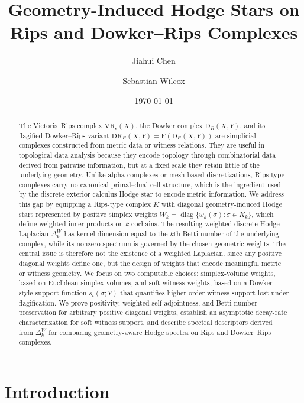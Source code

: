 \documentclass[11pt]{amsart}
\title[Geometry-Induced Hodge Stars on Rips-Type Complexes]
      {Geometry-Induced Hodge Stars on Rips and Dowker--Rips Complexes}
\author{Jiahui Chen}
\author{Sebastian Wilcox}
\date{\today}
\theoremstyle{plain}
\newcommand{\Dow}{\mathrm{D}}
\newcommand{\DR}{\mathrm{DR}}
\newcommand{\Flag}{\mathrm{F}}
\begin{document}
\begin{abstract}
    The Vietoris--Rips complex $\mathrm{VR}_\epsilon(X)$, the Dowker complex $\Dow_R(X,Y)$, and its flagified Dowker--Rips variant $\DR_R(X,Y)=\Flag(\Dow_R(X,Y))$ are simplicial complexes constructed from metric data or witness relations. They are useful in topological data analysis because they encode topology through combinatorial data derived from pairwise information, but at a fixed scale they retain little of the underlying geometry. Unlike alpha complexes or mesh-based discretizations, Rips-type complexes carry no canonical primal--dual cell structure, which is the ingredient used by the discrete exterior calculus Hodge star to encode metric information. We address this gap by equipping a Rips-type complex $K$ with diagonal geometry-induced Hodge stars represented by positive simplex weights $W_k=\operatorname{diag}\{w_k(\sigma):\sigma\in K_k\}$, which define weighted inner products on $k$-cochains. The resulting weighted discrete Hodge Laplacian $\Delta_k^W$ has kernel dimension equal to the $k$th Betti number of the underlying complex, while its nonzero spectrum is governed by the chosen geometric weights. The central issue is therefore not the existence of a weighted Laplacian, since any positive diagonal weights define one, but the design of weights that encode meaningful metric or witness geometry. We focus on two computable choices: simplex-volume weights, based on Euclidean simplex volumes, and soft witness weights, based on a Dowker-style support function $s_t(\sigma;Y)$ that quantifies higher-order witness support lost under flagification. We prove positivity, weighted self-adjointness, and Betti-number preservation for arbitrary positive diagonal weights, establish an asymptotic decay-rate characterization for soft witness support, and describe spectral descriptors derived from $\Delta_k^W$ for comparing geometry-aware Hodge spectra on Rips and Dowker--Rips complexes.
\end{abstract}

\maketitle

\section{Introduction}
\label{sec:intro}
\end{document}
